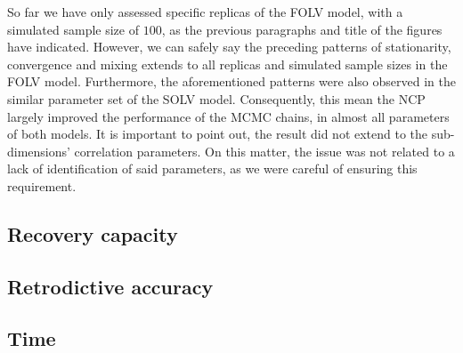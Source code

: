 So far we have only assessed specific replicas of the FOLV model, with a simulated sample size of $100$, as the previous paragraphs and title of the figures have indicated. However, we can safely say the preceding patterns of stationarity, convergence and mixing extends to all replicas and simulated sample sizes in the FOLV model. Furthermore, the aforementioned patterns were also observed in the similar parameter set of the SOLV model. Consequently, this mean the NCP largely improved the performance of the MCMC chains, in almost all parameters of both models. It is important to point out, the result did not extend to the sub-dimensions' correlation parameters. On this matter, the issue was not related to a lack of identification of said parameters, as we were careful of ensuring this requirement.



\subsection{Recovery capacity}

\subsection{Retrodictive accuracy}

\subsection{Time}


